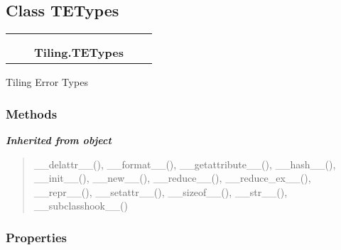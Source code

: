 

\subsection{Class TETypes}

    \label{Tiling:TETypes}
\begin{tabular}{cccccc}
\multicolumn{2}{r}{\settowidth{\BCL}{object}\multirow{2}{\BCL}{object}}
&&
  \\\cline{3-3}
  &&\multicolumn{1}{c|}{}
&&
  \\
&&\multicolumn{2}{l}{\textbf{Tiling.TETypes}}
\end{tabular}

Tiling Error Types



  \subsubsection{Methods}


\large{\textbf{\textit{Inherited from object}}}

\begin{quote}
\_\_delattr\_\_(), \_\_format\_\_(), \_\_getattribute\_\_(), \_\_hash\_\_(), \_\_init\_\_(), \_\_new\_\_(), \_\_reduce\_\_(), \_\_reduce\_ex\_\_(), \_\_repr\_\_(), \_\_setattr\_\_(), \_\_sizeof\_\_(), \_\_str\_\_(), \_\_subclasshook\_\_()
\end{quote}


  \subsubsection{Properties}

